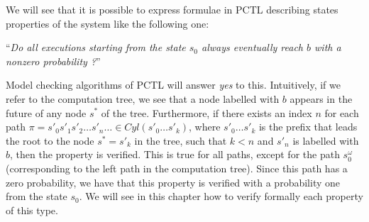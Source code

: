 \begin{example}
\begin{figure}[h]
\begin{minipage}{0.6\linewidth}
    \captionsetup{justification=centering}
    \label{ct2}
  \end{minipage}
\end{figure}
We will see that it is possible to express formulae in PCTL describing states properties of the system like the following one:
\begin{center}
``\textit{Do all executions starting from the state $s_0$ always eventually reach $b$ with a nonzero probability ?}''
\end{center}
Model checking algorithms of PCTL will answer \textit{yes} to this.
Intuitively, if we refer to the computation tree,
we see that a node labelled with $b$ appears in the future of any node $s^*$ of the tree. Furthermore, if there exists an index $n$ for each path $\pi = s'_0 s'_1 s'_2 \dots s'_n \dots \in Cyl(s'_0 \dots s'_k)$, where $s'_0 \dots s'_k$ is the prefix that leads the root to the node $s^* = s'_k$ in the tree, such that $k <n$ and $s'_n$ is labelled with $b$, then the property is verified. This is true for all paths,  except for the path $s_0^\omega$ (corresponding to the left path in the computation tree).
Since this path has a zero probability, we have that this property is verified with a probability one from the state $s_0$.
We will see in this chapter how to verify formally each property of this type.
\end{example}

